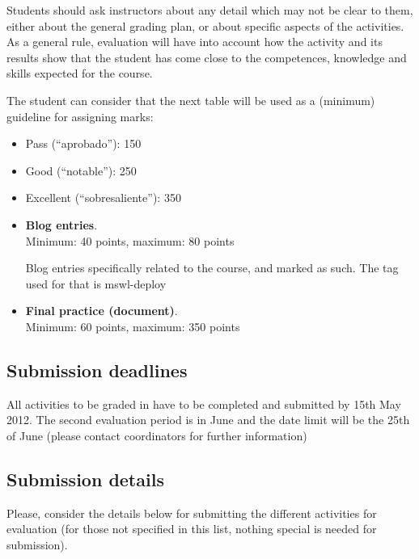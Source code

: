 \documentclass[a4paper]{article}
\begin{document}
Students should ask instructors about any detail which may not be
clear to them, either about the general grading plan, or about
specific aspects of the activities. As a general rule, evaluation will
have into account how the activity and its results show that the
student has come close to the competences, knowledge and skills
expected for the course.

The student can consider that the next table will be used as a
(minimum) guideline for assigning marks:

\begin{itemize}
\item Pass (``aprobado''): 150
\item Good (``notable''): 250
\item Excellent (``sobresaliente''): 350
\end{itemize}

\begin{itemize}
\item \textbf{Blog entries}. \\
  Minimum: 40 points, maximum: 80 points

  Blog entries specifically related to the course, and marked as such. The tag used for that is mswl-deploy


\item \textbf{Final practice (document)}. \\
  Minimum: 60 points, maximum: 350 points



\end{itemize}

\subsection{Submission deadlines}

All activities to be graded in have to be completed and submitted by 15th May 2012. The second evaluation period is in June and the date limit will be the 25th of June (please contact coordinators for further information)

\subsection{Submission details}

Please, consider the details below for submitting the different activities for evaluation (for those not specified in this list, nothing special is needed for submission).
\end{document}
